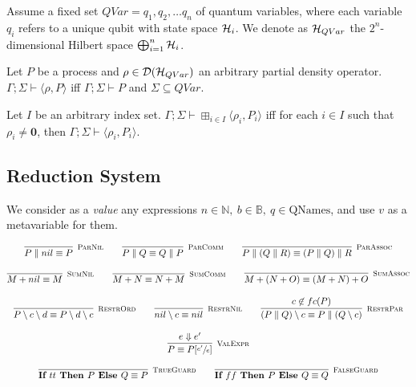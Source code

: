 \begin{definition}
  Assume a fixed set  $QVar = {q_1, q_2, \ldots q_n}$ of quantum variables, where each variable $q_i$ refers to a unique qubit with state space $\mathcal{H}_i$. We denote as $\mathcal{H}_{QVar}$ the $2^n$-dimensional Hilbert space $\bigoplus_{i=1}^n \mathcal{H}_i$.

Let $P$ be a process and $\rho \in \mathcal{D}(\mathcal{H}_{QVar})$ an arbitrary partial density operator. $\Gamma; \Sigma \vdash \langle \rho, P \rangle$ iff $\Gamma; \Sigma \vdash P$ and $\Sigma \subseteq QVar$.

  Let $I$ be an arbitrary index set. $\Gamma; \Sigma \vdash \boxplus_{i \in I} \langle \rho_i, P_i \rangle$ iff for each $i \in I$ such that $\rho_i \neq \mathbf{0}$,
  then $\Gamma; \Sigma \vdash \langle \rho_i, P_i \rangle$.
\end{definition}


\subsection{Reduction System}

We consider as a \textit{value} any expressions $n \in \mathbb{N},\  b \in \mathbb{B},\  q \in  \text{QNames}$, and use $v$ as a metavariable for them.

	\begin{gather*}
    \infer[\mbox{\footnotesize\scshape ParNil}]{P \parallel nil \equiv P}{} \qquad
    \infer[\mbox{\footnotesize\scshape ParComm}]{P \parallel Q \equiv Q \parallel P}{} \qquad
    \infer[\mbox{\footnotesize\scshape ParAssoc}]{P \parallel (Q \parallel R) \equiv (P \parallel Q) \parallel R}{} 
    \\[0.3cm]
    \infer[\mbox{\footnotesize\scshape SumNil}]{M + nil \equiv M}{} \qquad
    \infer[\mbox{\footnotesize\scshape SumComm}]{M + N \equiv N + M}{} \qquad
    \infer[\mbox{\footnotesize\scshape SumAssoc}]{M + (N + O) \equiv (M + N) + O}{} 
    \\[0.3cm]
    \infer[\mbox{\footnotesize\scshape RestrOrd}]{P \setminus c \setminus d \equiv P \setminus d \setminus c}{} \qquad 
    \infer[\mbox{\footnotesize\scshape RestrNil}]{nil \setminus c \equiv nil}{} \qquad 
    \infer[\mbox{\footnotesize\scshape RestrPar}]{(P \parallel Q) \setminus c \equiv P \parallel (Q \setminus c)}{c \not\in fc(P)} \\[0.3cm]
    \infer[\mbox{\footnotesize\scshape ValExpr}]{ P \equiv P[\sfrac{e'}{e}] }{e \Downarrow e'} \\[0.3cm]
    \infer[\mbox{\footnotesize\scshape TrueGuard}]{\ITE{tt}{P}{Q} \equiv P}{} \qquad
    \infer[\mbox{\footnotesize\scshape FalseGuard}]{\ITE{ff}{P}{Q} \equiv Q}{} 
	\end{gather*}	


